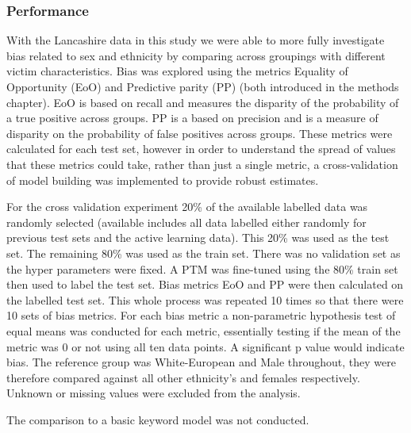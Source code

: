 \subsubsection{Performance} With the Lancashire data in this study we were able to more fully investigate bias related to sex and ethnicity by comparing across groupings with different victim characteristics. Bias was explored using the metrics Equality of Opportunity (EoO) and Predictive parity (PP) (both introduced in the methods chapter). EoO is based on recall and measures the disparity of the probability of a true positive across groups. PP is a based on precision and is a measure of disparity on the probability of false positives across groups. These metrics were calculated for each test set, however in order to understand the spread of values that these metrics could take, rather than just a single metric, a cross-validation of model building was implemented to provide robust estimates. 

For the cross validation experiment 20\% of the available labelled data was randomly selected (available includes all data labelled either randomly for previous test sets and the active learning data). This 20\% was used as the test set. The remaining 80\% was used as the train set. There was no validation set as the hyper parameters were fixed. A PTM was fine-tuned using the 80\% train set then used to label the test set. Bias metrics EoO and PP were then calculated on the labelled test set. This whole process was repeated 10 times so that there were 10 sets of bias metrics. For each bias metric a non-parametric hypothesis test of equal means was conducted for each metric, essentially testing if the mean of the metric was 0 or not using all ten data points. A significant p value would indicate bias. The reference group was White-European and Male throughout, they were therefore compared against all other ethnicity's and females respectively. Unknown or missing values were excluded from the analysis. 

The comparison to a basic keyword model was not conducted.


